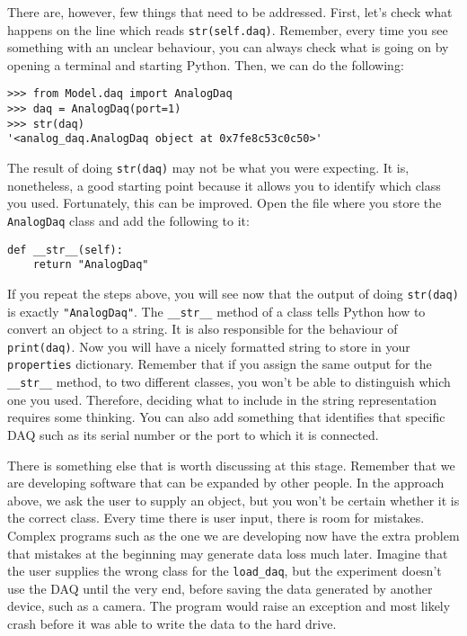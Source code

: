 There are, however, few things that need to be addressed. First, let's check what happens on the line which reads \texttt{str(self.daq)}. Remember, every time you see something with an unclear behaviour, you can always check what is going on by opening a terminal and starting Python. Then, we can do the following:

\begin{verbatim}
>>> from Model.daq import AnalogDaq
>>> daq = AnalogDaq(port=1)
>>> str(daq)
'<analog_daq.AnalogDaq object at 0x7fe8c53c0c50>'
\end{verbatim}

The result of doing \texttt{str(daq)} may not be what you were expecting. It is, nonetheless, a good starting point because it allows you to identify which class you used. Fortunately, this can be improved. Open the file where you store the \texttt{AnalogDaq} class and add the following to it:

\begin{verbatim}
def __str__(self):
    return "AnalogDaq"
\end{verbatim}

If you repeat the steps above, you will see now that the output of doing \texttt{str(daq)} is exactly \texttt{"AnalogDaq"}. The
\texttt{__str__} method of a class tells Python how to convert an object to a string. It is also responsible for the behaviour of \texttt{print(daq)}. Now you will have a nicely formatted string to store in your \texttt{properties} dictionary. Remember that if you assign the same output for the \texttt{__str__} method, to two different classes, you won't be able to distinguish which one you used. Therefore, deciding what to include in the string representation requires some thinking. You can also add something that identifies that specific DAQ such as its serial number or the port to which it is connected. 

There is something else that is worth discussing at this stage. Remember that we are developing software that can be expanded by other people. In the approach above, we ask the user to supply an object, but you won't be certain whether it is the correct class. Every time there is user input, there is room for mistakes. Complex programs such as the one we are developing now have the extra problem that mistakes at the beginning may generate data loss much later. Imagine that the user supplies the wrong class for the \texttt{load_daq}, but the experiment doesn't use the DAQ until the very end, before saving the data generated by another device, such as a camera. The program would raise an exception and most likely crash before it was able to write the data to the hard drive. 

